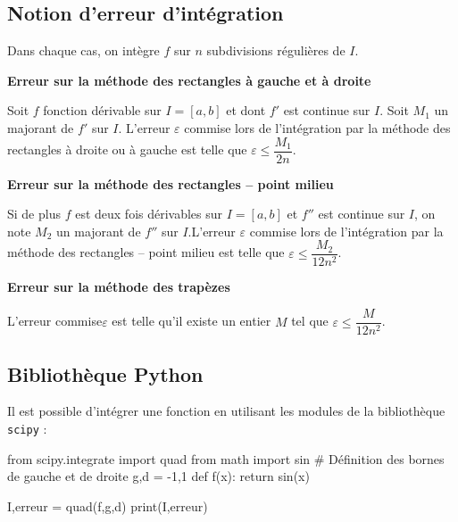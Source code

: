 \documentclass[10pt,fleqn]{article} %
\begin{document}
\subsection*{Notion d'erreur d'intégration}
\begin{resultat}
Dans chaque cas,  on intègre $f$ sur $n$ subdivisions régulières de $I$. 

\textbf{Erreur sur la méthode des rectangles à gauche et à droite}

Soit $f$ fonction dérivable sur $I=[a,b]$ et dont $f'$ est continue sur $I$. Soit $M_1$ un majorant de $f'$ sur $I$. L'erreur $\varepsilon$ commise lors de l'intégration par la méthode des rectangles à droite ou à gauche
 est telle que $ \varepsilon \leq \dfrac{M_1}{2n}$.

\textbf{Erreur sur la méthode des rectangles -- point milieu}

Si de plus $f$ est deux fois dérivables sur $I=[a,b]$ et $f''$ est continue sur $I$, on note $M_2$ un majorant de $f''$ sur $I$.L'erreur $\varepsilon$ commise lors de l'intégration par la méthode des rectangles -- point milieu est telle que $ \varepsilon \leq \dfrac{M_2}{12n^2}$.

\textbf{Erreur sur la méthode des trapèzes}

L'erreur commise$\varepsilon$ est telle qu'il existe un entier $M$ tel que $ \varepsilon \leq \dfrac{M}{12n^2}$.

\end{resultat}
\newpage

\subsection*{Bibliothèque Python}
Il est possible d'intégrer une fonction en utilisant les modules de la bibliothèque \texttt{scipy} :
\begin{py}
\begin{python}
from scipy.integrate import quad
from math import sin
# Définition des bornes de gauche et de droite
g,d = -1,1 
def f(x):
    return sin(x)
   
I,erreur = quad(f,g,d)
print(I,erreur)
\end{python}
\end{py}
\end{document}

